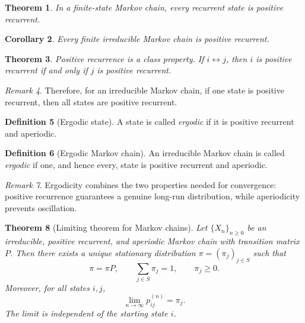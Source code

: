 \documentclass[11pt]{article}
\theoremstyle{plain}
\newtheorem{theorem}{Theorem}[section]
\newtheorem{corollary}[theorem]{Corollary}
\theoremstyle{definition}
\newtheorem{definition}[theorem]{Definition}
\theoremstyle{remark}
\newtheorem{remark}[theorem]{Remark}
\begin{document}
	\begin{theorem}
		In a finite-state Markov chain, every recurrent state is positive recurrent.
	\end{theorem}
	
	\begin{corollary}
		Every finite irreducible Markov chain is positive recurrent.
	\end{corollary}
	
	\begin{theorem}
		Positive recurrence is a class property. If \(i\leftrightarrow j\), then \(i\) is positive recurrent if and only if \(j\) is positive recurrent.
	\end{theorem}
	
	\begin{remark}
		Therefore, for an irreducible Markov chain, if one state is positive recurrent, then all states are positive recurrent.
	\end{remark}
	
	
	
	
	
	\begin{definition}[Ergodic state]
		A state is called \emph{ergodic} if it is positive recurrent and aperiodic.
	\end{definition}
	
	\begin{definition}[Ergodic Markov chain]
		An irreducible Markov chain is called \emph{ergodic} if one, and hence every, state is positive recurrent and aperiodic.
	\end{definition}
	
	\begin{remark}
		Ergodicity combines the two properties needed for convergence: positive recurrence guarantees a genuine long-run distribution, while aperiodicity prevents oscillation.
	\end{remark}
	
	\begin{theorem}[Limiting theorem for Markov chains]
		Let \(\{X_n\}_{n\ge 0}\) be an irreducible, positive recurrent, and aperiodic Markov chain with transition matrix \(P\). Then there exists a unique stationary distribution \(\pi=(\pi_j)_{j\in S}\) such that
		\[
		\pi=\pi P,
		\qquad
		\sum_{j\in S}\pi_j=1,
		\qquad
		\pi_j\ge 0.
		\]
		Moreover, for all states \(i,j\),
		\[
		\lim_{n\to\infty}p_{ij}^{(n)}=\pi_j.
		\]
		The limit is independent of the starting state \(i\).
	\end{theorem}
	
\end{document}
